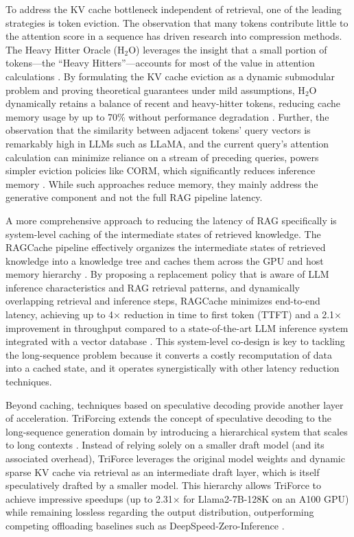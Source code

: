 \documentclass[11pt]{article}
\begin{document}
To address the KV cache bottleneck independent of retrieval, one of the leading strategies is token eviction. The observation that many tokens contribute little to the attention score in a sequence has driven research into compression methods. The Heavy Hitter Oracle (H\(_2\)O) leverages the insight that a small portion of tokens---the ``Heavy Hitters''---accounts for most of the value in attention calculations \cite{ref226}. By formulating the KV cache eviction as a dynamic submodular problem and proving theoretical guarantees under mild assumptions, H\(_2\)O dynamically retains a balance of recent and heavy-hitter tokens, reducing cache memory usage by up to 70\% without performance degradation \cite{ref226}. Further, the observation that the similarity between adjacent tokens' query vectors is remarkably high in LLMs such as LLaMA, and the current query's attention calculation can minimize reliance on a stream of preceding queries, powers simpler eviction policies like CORM, which significantly reduces inference memory \cite{ref231}. While such approaches reduce memory, they mainly address the generative component and not the full RAG pipeline latency.

A more comprehensive approach to reducing the latency of RAG specifically is system-level caching of the intermediate states of retrieved knowledge. The RAGCache pipeline effectively organizes the intermediate states of retrieved knowledge into a knowledge tree and caches them across the GPU and host memory hierarchy \cite{ref58}. By proposing a replacement policy that is aware of LLM inference characteristics and RAG retrieval patterns, and dynamically overlapping retrieval and inference steps, RAGCache minimizes end-to-end latency, achieving up to 4× reduction in time to first token (TTFT) and a 2.1× improvement in throughput compared to a state-of-the-art LLM inference system integrated with a vector database \cite{ref58}. This system-level co-design is key to tackling the long-sequence problem because it converts a costly recomputation of data into a cached state, and it operates synergistically with other latency reduction techniques.

Beyond caching, techniques based on speculative decoding provide another layer of acceleration. TriForcing extends the concept of speculative decoding to the long-sequence generation domain by introducing a hierarchical system that scales to long contexts \cite{ref227}. Instead of relying solely on a smaller draft model (and its associated overhead), TriForce leverages the original model weights and dynamic sparse KV cache via retrieval as an intermediate draft layer, which is itself speculatively drafted by a smaller model. This hierarchy allows TriForce to achieve impressive speedups (up to 2.31× for Llama2-7B-128K on an A100 GPU) while remaining lossless regarding the output distribution, outperforming competing offloading baselines such as DeepSpeed-Zero-Inference \cite{ref227}.
\end{document}
